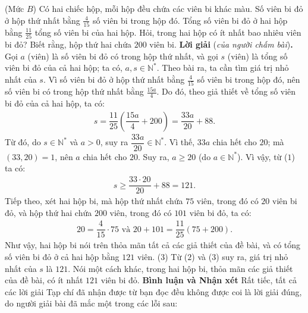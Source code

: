 \begin{multicols}{2}
	\setlength{\abovedisplayskip}{4pt}
	\setlength{\belowdisplayskip}{4pt}
	{}
	(Mức $B$)
	Có hai chiếc hộp, mỗi hộp đều chứa các viên bi khác màu. Số viên bi đỏ ở hộp thứ nhất bằng $\frac{4}{15}$ số viên bi trong hộp đó. Tổng số viên bi đỏ ở hai hộp bằng $\frac{11}{25}$ tổng số viên bi của hai hộp. Hỏi, trong hai hộp có ít nhất bao nhiêu viên bi đỏ? Biết rằng, hộp thứ hai chứa $200$ viên bi.
	\vskip 0.05cm
	\textbf{\color{thachthuctoanhoc}Lời giải} (\textit{của người chấm bài})\textbf{\color{thachthuctoanhoc}.}
	\vskip 0.05cm
	Gọi $a$ (viên) là số viên bi đỏ có trong hộp thứ nhất, và gọi $s$ (viên) là tổng số viên bi đỏ của cả hai hộp; ta có, $a, s \in \mathbb{N^*}$. Theo bài ra, ta cần tìm giá trị nhỏ nhất của $s$.
	\vskip 0.05cm
	Vì số viên bi đỏ ở hộp thứ nhất bằng $\frac{4}{15}$  số viên bi trong hộp đó, nên số viên bi có trong hộp thứ nhất bằng  $\frac{15a}{4}$. Do đó, theo giả thiết về tổng số viên bi đỏ của cả hai hộp, ta có:
	\begin{align*}
		s = \dfrac{{11}}{{25}}\left( {\dfrac{{15a}}{4} + 200} \right) = \dfrac{{33a}}{{20}} + 88. \tag{$1$}
	\end{align*}
	Từ đó, do $s \in \mathbb{N^*}$ và $a > 0$, suy ra  $\dfrac{33a}{20} \in \mathbb{N^*}$. Vì thế, $33a$ chia hết cho $20$; mà $(33, 20) = 1$, nên $a$ chia hết cho $20$. Suy ra, $a \ge 20$ (do  $a \in \mathbb{N^*}$). Vì vậy, từ ($1$) ta có:
	\begin{align*}
		s \ge \dfrac{{33 \cdot 20}}{{20}} + 88 = 121. \tag{$2$}	
	\end{align*}
	Tiếp theo, xét hai hộp bi, mà hộp thứ nhất chứa $75$ viên, trong đó có $20$ viên bi đỏ, và hộp thứ hai chứa $200$ viên, trong đó có $101$ viên bi đỏ, ta có:
	\begin{align*}
		20 = \dfrac{4}{{15}} \cdot 75 \text{ và } 20 + 101 = \dfrac{{11}}{{25}}\left( {75 + 200} \right).
	\end{align*}
	Như vậy, hai hộp bi nói trên thỏa mãn tất cả các giả thiết của đề bài, và có tổng số viên bi đỏ ở cả hai hộp bằng $121$ viên. \hfill ($3$)
	\vskip 0.05cm
	Từ ($2$) và ($3$) suy ra, giá trị nhỏ nhất của $s$ là $121$. Nói một cách khác, trong hai hộp bi, thỏa mãn các giả thiết của đề bài, có ít nhất $121$ viên bi đỏ.
	\vskip 0.05cm
	\textbf{\color{thachthuctoanhoc}Bình luận và Nhận xét}
	\vskip 0.05cm	
	Rất tiếc, tất cả các lời giải Tạp chí đã nhận được từ bạn đọc đều không được coi là lời giải đúng, do người giải bài đã mắc một trong các lỗi sau:

\end{multicols}
